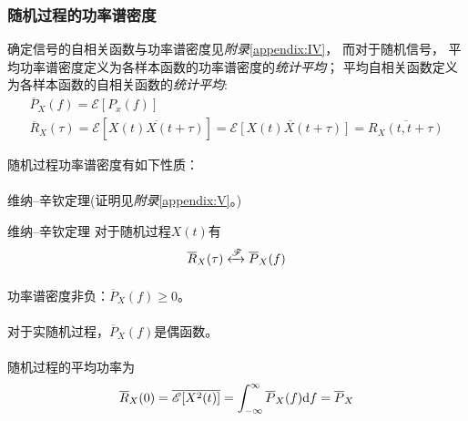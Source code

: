     \subsubsection{随机过程的功率谱密度}
    确定信号的自相关函数与功率谱密度见\emph{附录}\ref{appendix:IV}，
    而对于随机信号，
    平均功率谱密度定义为各样本函数的功率谱密度的\emph{统计平均}；
    平均自相关函数定义为各样本函数的自相关函数的\emph{统计平均}:
    \begin{align}
        \overline{P}_X(f)=\mathscr{E}[P_x(f)]\hspace{10em}\\
        \overline{R}_X(\tau)=\mathscr{E}[\overline{X(t)X(t+\tau)}]=\overline{\mathscr{E}[X(t)X(t+\tau)]}=\overline{R_X(t,t+\tau)}
    \end{align}

    随机过程功率谱密度有如下性质：
    \vspace{-1ex}
    
    \paragraph{}{维纳--辛钦定理(证明见\emph{附录}\ref{appendix:V}。)}
    \begin{mythm}{维纳--辛钦定理}\label{thm:Wiener_Khinchin}
        对于随机过程$X(t)$有
        \begin{equation}
            \overline{R}_X(\tau)\xleftrightarrow[]{\mathscr{F}}\overline{P}_X(f)
        \end{equation}
    \end{mythm}

    \paragraph{}功率谱密度非负：$\overline{P}_X(f)\geq 0$。

    \paragraph{}对于实随机过程，$\overline{P}_X(f)$是偶函数。

    \paragraph{}随机过程的平均功率为
    \begin{equation}
        \overline{R}_X(0)=\overline{\mathscr{E}[X^2(t)]}=\int_{-\infty}^{\infty}\overline{P}_X(f)\text{\upshape d} f=\overline{P}_X
    \end{equation}

